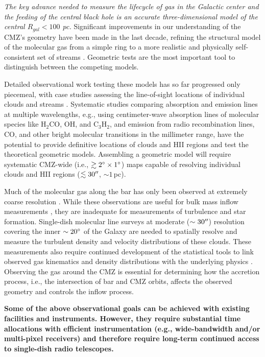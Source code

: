 \documentclass[modern]{aastex62}
\begin{document}
\textit{The key advance needed to measure the lifecycle of gas in the Galactic
center and the feeding of the central black hole is an accurate
three-dimensional model of the central $R_{gal}<100$ pc.} Significant improvements in
our understanding
of the CMZ's geometry have been made in the last decade, refining the structural
model of the molecular gas from a simple ring to a more realistic and physically
self-consistent set of streams
\citep{Molinari2011a,Kruijssen2015a,Ridley2017a,Sormani2018a,Kruijssen2019b}.
Geometric tests are the most important tool to distinguish
between the competing models.

Detailed observational work testing these models has so far progressed only
piecemeal, with case studies assessing the line-of-sight locations of
individual clouds and streams \citep[e.g.,][]{Henshaw2016a,Butterfield2018a}.
Systematic studies
comparing absorption and emission lines at multiple wavelengths, e.g., using
centimeter-wave absorption lines of molecular species like H$_2$CO, OH,
and C$_3$H$_2$, and emission from radio recombination lines, CO, and other bright
molecular transitions in the millimeter range, have the potential to provide
definitive locations of clouds and HII regions and test the theoretical
geometric models.  Assembling a geometric model will require systematic
CMZ-wide (i.e., $\gtrsim2^{\circ}\times1^{\circ}$) maps capable of resolving
individual clouds and HII regions ($\lesssim30\mbox{$^{\prime\prime}$}$, $\sim 1\,$pc).  

Much of the molecular gas along the bar has only been observed at extremely
coarse resolution \citep{Dame2001a}. While these observations are useful for
bulk mass inflow measurements \citep[e.g.,][]{Sormani2019a}, they are
inadequate for measurements of turbulence and star formation. Single-dish
molecular line surveys at moderate ($\sim30\mbox{$^{\prime\prime}$}$) resolution covering the
inner $\sim20^{\circ}$ of the Galaxy are needed to spatially resolve and
measure the turbulent
density and velocity distributions of these clouds. These measurements also
require continued development of the statistical tools to link observed gas
kinematics
and density distributions with the underlying physics
\citep{Koch2017a,Burkhart2018a}.  Observing the gas around the CMZ is essential
for determining how the accretion process, i.e., the intersection of bar and
CMZ orbits, affects the observed geometry and controls the inflow process.

\textbf{
Some of the above observational goals can be achieved with existing facilities
and instruments.  However, they require substantial time allocations with
efficient instrumentation (e.g., wide-bandwidth and/or multi-pixel receivers) and
therefore require long-term continued access to single-dish radio telescopes.
}
\end{document}
